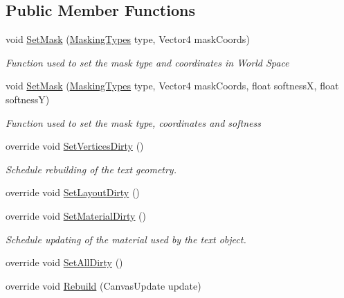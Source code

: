 \subsection*{Public Member Functions}
\begin{DoxyCompactItemize}
\item 
void \mbox{\hyperlink{class_t_m_pro_1_1_text_mesh_pro_ae6c2606deaf5123ee63defb1582cbc50}{Set\+Mask}} (\mbox{\hyperlink{namespace_t_m_pro_adca59e3caf7e75b8dfdcac4f70a31987}{Masking\+Types}} type, Vector4 mask\+Coords)
\begin{DoxyCompactList}\small\item\em Function used to set the mask type and coordinates in World Space \end{DoxyCompactList}\item 
void \mbox{\hyperlink{class_t_m_pro_1_1_text_mesh_pro_a907c0bf8a284315eba6099f07dd98a38}{Set\+Mask}} (\mbox{\hyperlink{namespace_t_m_pro_adca59e3caf7e75b8dfdcac4f70a31987}{Masking\+Types}} type, Vector4 mask\+Coords, float softnessX, float softnessY)
\begin{DoxyCompactList}\small\item\em Function used to set the mask type, coordinates and softness \end{DoxyCompactList}\item 
override void \mbox{\hyperlink{class_t_m_pro_1_1_text_mesh_pro_a8ca7b09fd7f2319069c84e72c0db0fa8}{Set\+Vertices\+Dirty}} ()
\begin{DoxyCompactList}\small\item\em Schedule rebuilding of the text geometry. \end{DoxyCompactList}\item 
override void \mbox{\hyperlink{class_t_m_pro_1_1_text_mesh_pro_ab11edb348c490d22eca925f2a96029e3}{Set\+Layout\+Dirty}} ()
\item 
override void \mbox{\hyperlink{class_t_m_pro_1_1_text_mesh_pro_af2177065726b878773a7798a3e4aedf7}{Set\+Material\+Dirty}} ()
\begin{DoxyCompactList}\small\item\em Schedule updating of the material used by the text object. \end{DoxyCompactList}\item 
override void \mbox{\hyperlink{class_t_m_pro_1_1_text_mesh_pro_a28274571ae3e165a5db057949ae2f3ea}{Set\+All\+Dirty}} ()
\item 
override void \mbox{\hyperlink{class_t_m_pro_1_1_text_mesh_pro_a8ea12a256e97a7ab1d66945b5f3a0a88}{Rebuild}} (Canvas\+Update update)

\end{DoxyCompactItemize}
